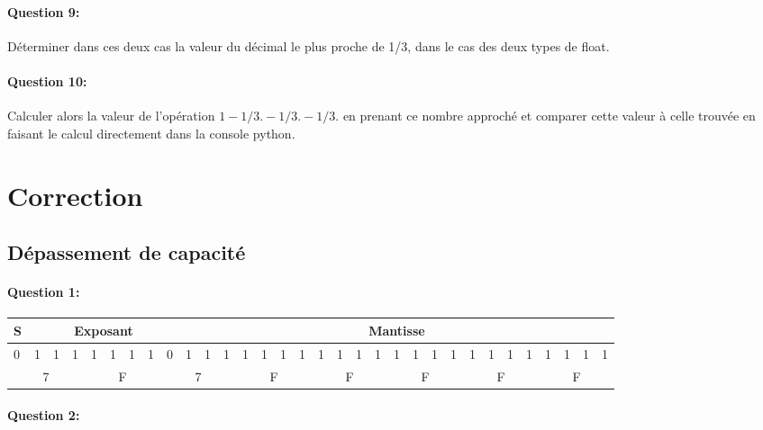 \paragraph{Question 9:} Déterminer dans ces deux cas la valeur du décimal le plus proche de 1/3, dans le cas des deux types de float.

\paragraph{Question 10:} Calculer alors la valeur de l'opération $1-1/3.-1/3.-1/3.$ en prenant ce nombre approché et comparer cette valeur à celle trouvée en faisant le calcul directement dans la console python.

\newpage
\section{Correction}

\subsection{Dépassement de capacité}

\paragraph{Question 1:}

\setlength{\tabcolsep}{0.1cm}
\begin{center}
\begin{scriptsize}
\begin{tabular}{|*{32}{l|}}
\hline
S & \multicolumn{8}{c|}{Exposant} & \multicolumn{23}{c|}{Mantisse} \\
\hline
0 & 1 & 1 & 1 & 1 & 1 & 1 & 1 & 0 & 1 & 1 & 1 & 1 & 1 & 1 & 1 & 1 & 1 & 1 & 1 & 1 & 1 & 1 & 1 & 1 & 1 & 1 & 1 & 1 & 1 & 1 & 1 \\
\hline
\multicolumn{4}{|c|}{7} & \multicolumn{4}{c|}{F} & \multicolumn{4}{c|}{7} & \multicolumn{4}{c|}{F} & \multicolumn{4}{c|}{F} & \multicolumn{4}{c|}{F} & 
\multicolumn{4}{c|}{F} & \multicolumn{4}{c|}{F} \\
\hline
\end{tabular}
\end{scriptsize}
\end{center}

\paragraph{Question 2:}

